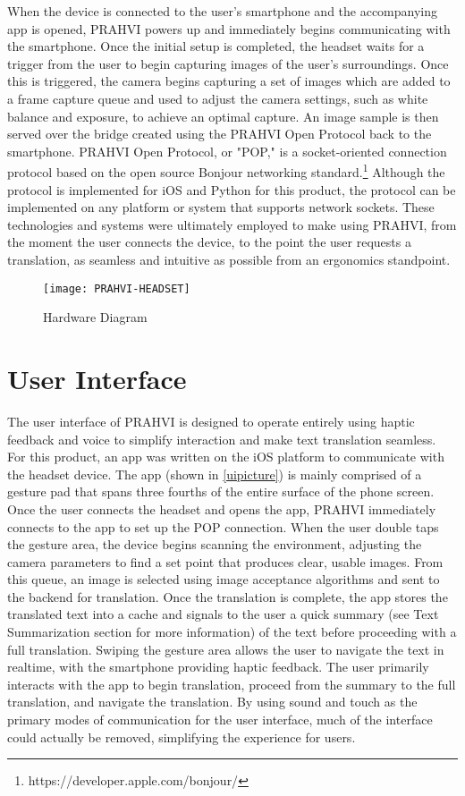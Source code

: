When the device is connected to the user's smartphone and the accompanying app is opened, PRAHVI powers up and immediately begins communicating with the smartphone. Once the initial setup is completed, the headset waits for a trigger from the user to begin capturing images of the user's surroundings. Once this is triggered, the camera begins capturing a set of images which are added to a frame capture queue and used to adjust the camera settings, such as white balance and exposure, to achieve an optimal capture. An image sample is then served over the bridge created using the PRAHVI Open Protocol back to the smartphone. PRAHVI Open Protocol, or "POP," is a socket-oriented connection protocol based on the open source Bonjour networking standard.\footnote{https://developer.apple.com/bonjour/} Although the protocol is implemented for iOS and Python for this product, the protocol can be implemented on any platform or system that supports network sockets. These technologies and systems were ultimately employed to make using PRAHVI, from the moment the user connects the device, to the point the user requests a translation, as seamless and intuitive as possible from an ergonomics standpoint.

\begin{figure}
	\centering
	\texttt{[image: PRAHVI-HEADSET]}
	\caption{Hardware Diagram}
	\label{headsetDiagram}
\end{figure}

\section{User Interface}
The user interface of PRAHVI is designed to operate entirely using haptic feedback and voice to simplify interaction and make text translation seamless. For this product, an app was written on the iOS platform to communicate with the headset device. The app (shown in \ref{uipicture}) is mainly comprised of a gesture pad that spans three fourths of the entire surface of the phone screen. Once the user connects the headset and opens the app, PRAHVI immediately connects to the app to set up the POP connection. When the user double taps the gesture area, the device begins scanning the environment, adjusting the camera parameters to find a set point that produces clear, usable images. From this queue, an image is selected using image acceptance algorithms and sent to the backend for translation. Once the translation is complete, the app stores the translated text into a cache and signals to the user a quick summary (see Text Summarization section for more information) of the text before proceeding with a full translation. Swiping the gesture area allows the user to navigate the text in realtime, with the smartphone providing haptic feedback. The user primarily interacts with the app to begin translation, proceed from the summary to the full translation, and navigate the translation. By using sound and touch as the primary modes of communication for the user interface, much of the interface could actually be removed, simplifying the experience for users.

